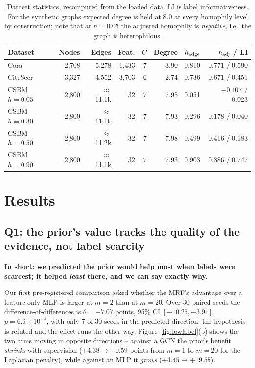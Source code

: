 \documentclass{article}
\begin{document}
\begin{table}[t]
\caption{Dataset statistics, recomputed from the loaded data. LI is label informativeness. For
the synthetic graphs expected degree is held at 8.0 at every homophily level by construction;
note that at $h=0.05$ the adjusted homophily is \emph{negative}, i.e.\ the graph is
heterophilous.}
\label{tab:data}
\begin{center}
\small
\begin{tabular}{lrrrrrrr}
\toprule
\textbf{Dataset} & \textbf{Nodes} & \textbf{Edges} & \textbf{Feat.} & \textbf{$C$} &
\textbf{Degree} & \textbf{$h_{\rm edge}$} & \textbf{$h_{\rm adj}$ / LI} \\
\midrule
Cora            & 2{,}708 & 5{,}278 & 1{,}433 & 7 & 3.90 & 0.810 & 0.771 / 0.590 \\
CiteSeer        & 3{,}327 & 4{,}552 & 3{,}703 & 6 & 2.74 & 0.736 & 0.671 / 0.451 \\
\midrule
CSBM $h{=}0.05$ & 2{,}800 & $\approx$11.1k & 32 & 7 & 7.95 & 0.051 & $-0.107$ / 0.023 \\
CSBM $h{=}0.30$ & 2{,}800 & $\approx$11.1k & 32 & 7 & 7.93 & 0.296 & 0.178 / 0.040 \\
CSBM $h{=}0.50$ & 2{,}800 & $\approx$11.2k & 32 & 7 & 7.98 & 0.499 & 0.416 / 0.183 \\
CSBM $h{=}0.90$ & 2{,}800 & $\approx$11.1k & 32 & 7 & 7.93 & 0.903 & 0.886 / 0.747 \\
\bottomrule
\end{tabular}
\end{center}
\end{table}

\section{Results}

\subsection{Q1: the prior's value tracks the quality of the evidence, not label scarcity}

\textbf{In short: we predicted the prior would help most when labels were scarcest; it helped
\emph{least} there, and we can say exactly why.}

Our first pre-registered comparison asked whether the MRF's advantage over a feature-only MLP is
larger at $m{=}2$ than at $m{=}20$. Over 30 paired seeds the difference-of-differences is
$\theta=-7.07$ points, 95\% CI $[-10.26,-3.91]$, $p=6.6\times10^{-4}$, with only 7 of 30 seeds in
the predicted direction: the hypothesis is refuted and the effect runs the other way.
Figure~\ref{fig:lowlabel}(b) shows the two arms moving in opposite directions -- against a GCN
the prior's benefit \emph{shrinks} with supervision ($+4.38\to+0.59$ points from $m{=}1$ to
$m{=}20$ for the Laplacian penalty), while against an MLP it \emph{grows}
($+4.45\to+19.55$).
\end{document}
